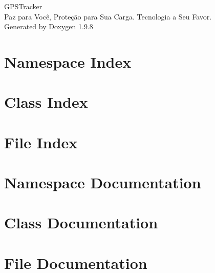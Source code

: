\documentclass[twoside]{book}
\newcommand{\+}{\discretionary{\mbox{\scriptsize$\hookleftarrow$}}{}{}}
\newcommand{\clearemptydoublepage}{%
    \newpage{\pagestyle{empty}\cleardoublepage}%
  }
\begin{document}
  \raggedbottom
    \hypersetup{pageanchor=false,
                bookmarksnumbered=true,
                pdfencoding=unicode
               }
  \begin{titlepage}
  \vspace*{7cm}
  \begin{center}%
  {\Large GPSTracker}\\
  [1ex]\large Paz para Você, Proteção para Sua Carga. Tecnologia a Seu Favor. \\
  \vspace*{1cm}
  {\large Generated by Doxygen 1.9.8}\\
  \end{center}
  \end{titlepage}
  \clearemptydoublepage
  \tableofcontents
  \clearemptydoublepage
  \hypersetup{pageanchor=true}
\chapter{Namespace Index}

\chapter{Class Index}

\chapter{File Index}

\chapter{Namespace Documentation}

\chapter{Class Documentation}





\chapter{File Documentation}










  \backmatter
  \newpage
  \clearemptydoublepage
  \printindex
\end{document}
